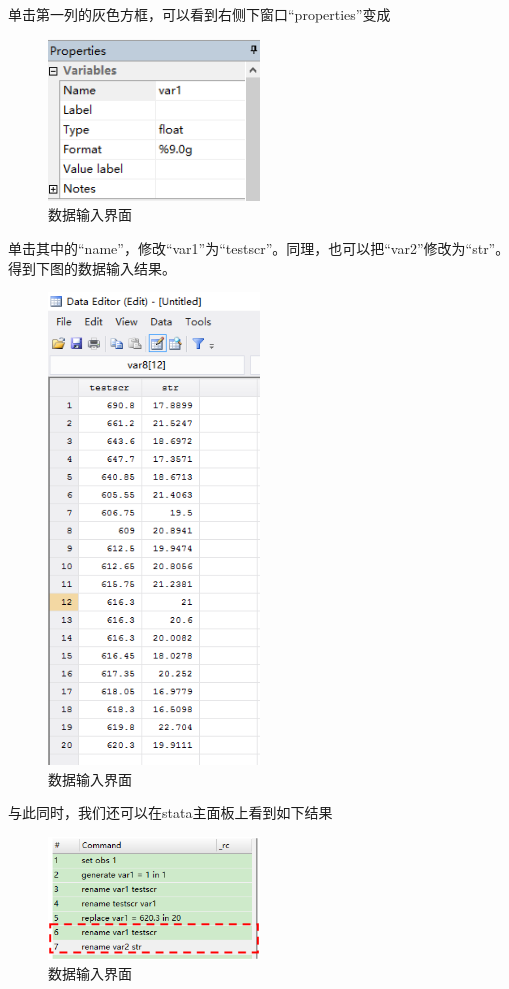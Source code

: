 \documentclass[cn,10pt,math=newtx,citestyle=gb7714-2015,bibstyle=gb7714-2015]{elegantbook}
\begin{document}
	单击第一列的灰色方框，可以看到右侧下窗口“properties”变成
	\begin{figure}[htbp]
		\centering
		\includegraphics[width=0.5\textwidth]{properties.png}
		\caption{数据输入界面}\label{fig:digit}
	\end{figure}
	
	单击其中的“name”，修改“var1”为“testscr”。同理，也可以把“var2”修改为“str”。得到下图的数据输入结果。
	\begin{figure}[htbp]
		\centering
		\includegraphics[width=0.5\textwidth]{data edit2.png}
		\caption{数据输入界面}\label{fig:digit}
	\end{figure}
	
	与此同时，我们还可以在stata主面板上看到如下结果
	\begin{figure}[htbp]
		\centering
		\includegraphics[width=0.5\textwidth]{command.png}
		\caption{数据输入界面}\label{fig:digit}
	\end{figure}
	
\end{document}

